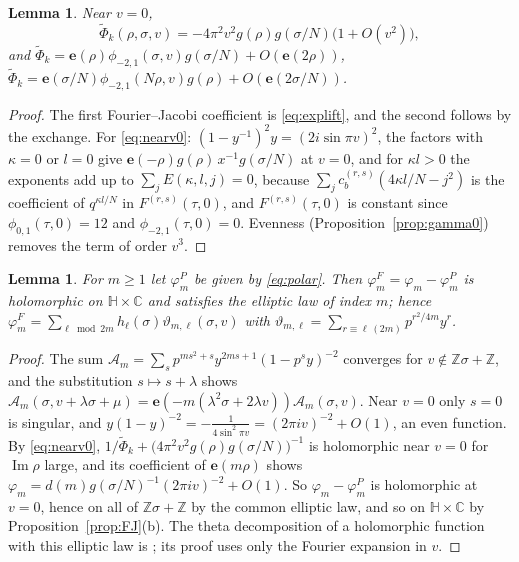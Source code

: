 \documentclass[11pt]{amsart}
\numberwithin{equation}{section}
\theoremstyle{plain}
\newtheorem{lem}[thm]{Lemma}
\theoremstyle{definition}
\theoremstyle{remark}
\newcommand{\Z}{\mathbb{Z}}
\newcommand{\C}{\mathbb{C}}
\newcommand{\cA}{\mathcal{A}}
\newcommand{\e}{\mathbf{e}}
\newcommand{\pmi}{\phi_{-2,1}}
\newcommand{\pz}{\phi_{0,1}}
\newcommand{\tPhi}{\widetilde{\Phi}}
\begin{document}
\begin{lem}\label{lem:weyl}
Near $v=0$,
\begin{equation}\label{eq:nearv0}
\tPhi_k(\rho,\sigma,v)=-4\pi^2v^2g(\rho)g(\sigma/N)\bigl(1+O(v^2)\bigr),
\end{equation}
and $\tPhi_k=\e(\rho)\pmi(\sigma,v)g(\sigma/N)+O(\e(2\rho))$, $\tPhi_k=\e(\sigma/N)\pmi(N\rho,v)g(\rho)+O(\e(2\sigma/N))$.
\end{lem}

\begin{proof}
The first Fourier--Jacobi coefficient is \eqref{eq:explift}, and the second follows by the exchange. For \eqref{eq:nearv0}: $(1-y^{-1})^2y=(2i\sin\pi v)^2$, the factors with $\kappa=0$ or $l=0$ give $\e(-\rho)g(\rho)\,x^{-1}g(\sigma/N)$ at $v=0$, and for $\kappa l>0$ the exponents add up to $\sum_jE(\kappa,l,j)=0$, because $\sum_jc^{(r,s)}_b(4\kappa l/N-j^2)$ is the coefficient of $q^{\kappa l/N}$ in $F^{(r,s)}(\tau,0)$, and $F^{(r,s)}(\tau,0)$ is constant since $\pz(\tau,0)=12$ and $\pmi(\tau,0)=0$. Evenness (Proposition~\ref{prop:gamma0}) removes the term of order $v^3$.
\end{proof}

\begin{lem}\label{lem:polar}
For $m\ge1$ let $\varphi^P_m$ be given by \eqref{eq:polar}. Then $\varphi^F_m=\varphi_m-\varphi^P_m$ is holomorphic on $\mathbb H\times\C$ and satisfies the elliptic law of index $m$; hence $\varphi^F_m=\sum_{\ell\bmod 2m}h_\ell(\sigma)\vartheta_{m,\ell}(\sigma,v)$ with $\vartheta_{m,\ell}=\sum_{r\equiv\ell\,(2m)}p^{r^2/4m}y^r$.
\end{lem}

\begin{proof}
The sum $\cA_m=\sum_sp^{ms^2+s}y^{2ms+1}(1-p^sy)^{-2}$ converges for $v\notin\Z\sigma+\Z$, and the substitution $s\mapsto s+\lambda$ shows $\cA_m(\sigma,v+\lambda\sigma+\mu)=\e(-m(\lambda^2\sigma+2\lambda v))\cA_m(\sigma,v)$. Near $v=0$ only $s=0$ is singular, and $y(1-y)^{-2}=-\frac1{4\sin^2\pi v}=(2\pi iv)^{-2}+O(1)$, an even function. By \eqref{eq:nearv0}, $1/\tPhi_k+\bigl(4\pi^2v^2g(\rho)g(\sigma/N)\bigr)^{-1}$ is holomorphic near $v=0$ for $\operatorname{Im}\rho$ large, and its coefficient of $\e(m\rho)$ shows $\varphi_m=d(m)g(\sigma/N)^{-1}(2\pi iv)^{-2}+O(1)$. So $\varphi_m-\varphi^P_m$ is holomorphic at $v=0$, hence on all of $\Z\sigma+\Z$ by the common elliptic law, and so on $\mathbb H\times\C$ by Proposition~\ref{prop:FJ}(b). The theta decomposition of a holomorphic function with this elliptic law is \cite[Theorem~5.1]{EZ85}; its proof uses only the Fourier expansion in $v$.
\end{proof}
\end{document}
